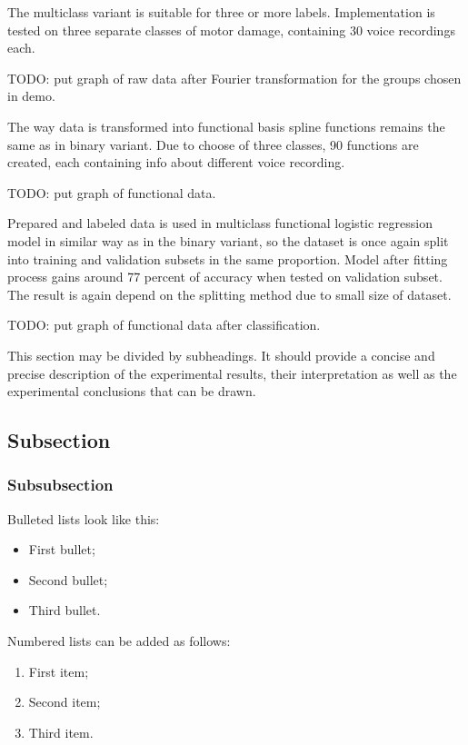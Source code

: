 \documentclass[energies,article,submit,pdftex,moreauthors]{Definitions/mdpi}
\begin{document}
The multiclass variant is suitable for three or more labels. Implementation is tested on three separate classes of motor damage, containing 30 voice recordings each.

\vspace{5mm}
TODO: put graph of raw data after Fourier transformation for the groups chosen in demo.
\vspace{5mm}

The way data is transformed into functional basis spline functions remains the same as in binary variant. Due to choose of three classes, 90 functions are created, each containing info about different voice recording. 

\vspace{5mm}
TODO: put graph of functional data.
\vspace{5mm}

Prepared and labeled data is used in multiclass functional logistic regression model in similar way as in the binary variant, so the dataset is once again split into training and validation subsets in the same proportion. Model after fitting process gains around 77 percent of accuracy when tested on validation subset. The result is again depend on the splitting method due to small size of dataset.

\vspace{5mm}
TODO: put graph of functional data after classification.
\vspace{5mm}


This section may be divided by subheadings. It should provide a concise and precise description of the experimental results, their interpretation as well as the experimental conclusions that can be drawn.
\subsection{Subsection}
\subsubsection{Subsubsection}

Bulleted lists look like this:
\begin{itemize}
\item	First bullet;
\item	Second bullet;
\item	Third bullet.
\end{itemize}

Numbered lists can be added as follows:
\begin{enumerate}
\item	First item; 
\item	Second item;
\item	Third item.
\end{enumerate}
\end{document}
